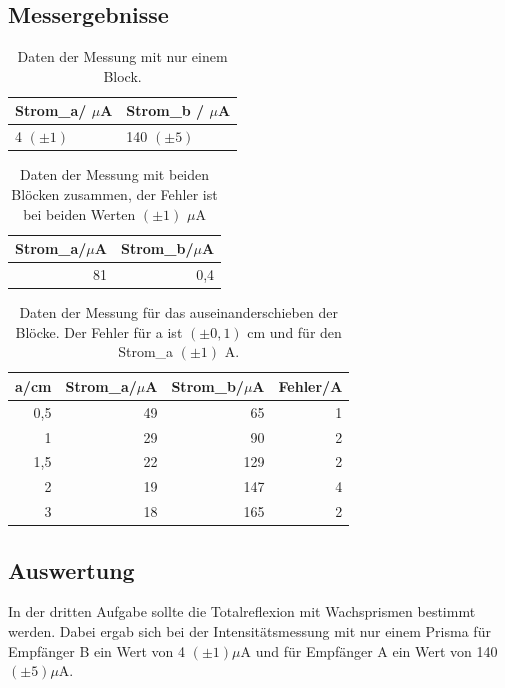 \documentclass[12pt]{scrartcl}
\begin{document}
\subsection{Messergebnisse}
\begin{table}[htbp]
\caption{Daten der Messung mit nur einem Block.}
\centering
\begin{tabular}{|l|l|}
\hline
Strom\_a/ $\mu$A & Strom\_b / $\mu$A \\ \hline
4 $(\pm1)$ & 140 $(\pm 5)$ \\ \hline
\end{tabular}
\label{tab:a_3_e}
\end{table}

\begin{table}[H]
\caption{Daten der Messung mit beiden Blöcken zusammen, der Fehler ist bei beiden Werten $(\pm 1)$ $\mu$A}
\centering
\begin{tabular}{|l|l|}
\hline
Strom\_a/$\mu$A & Strom\_b/$\mu$A \\ \hline
\multicolumn{1}{|r|}{81} & \multicolumn{1}{r|}{0,4} \\ \hline
\end{tabular}
\label{tab:a_3_z}
\end{table}

\begin{table}[htbp]
\caption{Daten der Messung für das auseinanderschieben der Blöcke. Der Fehler für a ist $(\pm 0,1)$ cm und für den Strom\_a $(\pm 1)$ A.}
\centering
\begin{tabular}{|r|r|r|r|}
\hline
\multicolumn{1}{|l|}{a/cm} & \multicolumn{1}{l|}{Strom\_a/$\mu$A} & \multicolumn{1}{l|}{Strom\_b/$\mu$A} & \multicolumn{1}{l|}{Fehler/A} \\ \hline
0,5 & 49 & 65 & 1 \\ \hline
1 & 29 & 90 & 2 \\ \hline
1,5 & 22 & 129 & 2 \\ \hline
2 & 19 & 147 & 4 \\ \hline
3 & 18 & 165 & 2 \\ \hline
\end{tabular}
\label{tab:a_3_m}
\end{table}
\subsection{Auswertung}
In der dritten Aufgabe sollte die Totalreflexion mit Wachsprismen bestimmt werden.
Dabei ergab sich bei der Intensitätsmessung mit nur einem Prisma  für Empfänger B ein Wert von 4 $(\pm 1) \mu$A und für Empfänger A ein Wert von 140 $(\pm 5) \mu$A.
\end{document}
